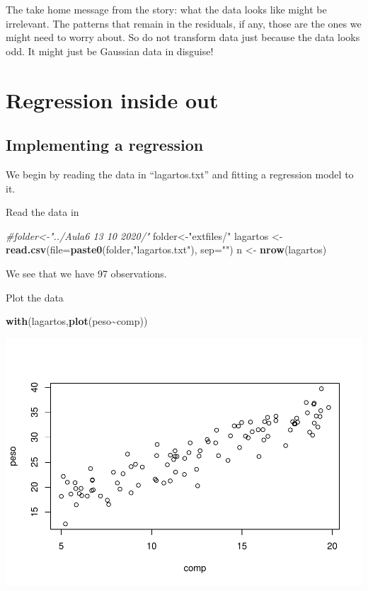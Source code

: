 \documentclass[
]{book}
\newenvironment{Shaded}{\begin{snugshade}}{\end{snugshade}}
\newcommand{\AttributeTok}[1]{\textcolor[rgb]{0.13,0.29,0.53}{#1}}
\newcommand{\CommentTok}[1]{\textcolor[rgb]{0.56,0.35,0.01}{\textit{#1}}}
\newcommand{\FunctionTok}[1]{\textcolor[rgb]{0.13,0.29,0.53}{\textbf{#1}}}
\newcommand{\NormalTok}[1]{#1}
\newcommand{\OtherTok}[1]{\textcolor[rgb]{0.56,0.35,0.01}{#1}}
\newcommand{\SpecialCharTok}[1]{\textcolor[rgb]{0.81,0.36,0.00}{\textbf{#1}}}
\newcommand{\StringTok}[1]{\textcolor[rgb]{0.31,0.60,0.02}{#1}}
\begin{document}
The take home message from the story: what the data looks like might be irrelevant. The patterns that remain in the residuals, if any, those are the ones we might need to worry about. So do not transform data just because the data looks odd. It might just be Gaussian data in disguise!

\hypertarget{aula6}{%
\chapter{Regression inside out}\label{aula6}}

\hypertarget{implementing-a-regression}{%
\section{Implementing a regression}\label{implementing-a-regression}}

We begin by reading the data in ``lagartos.txt'' and fitting a regression model to it.

Read the data in

\begin{Shaded}
\begin{Highlighting}[]
\CommentTok{\#folder\textless{}{-}"../Aula6 13 10 2020/"}
\NormalTok{folder}\OtherTok{\textless{}{-}}\StringTok{"extfiles/"}
\NormalTok{lagartos }\OtherTok{\textless{}{-}} \FunctionTok{read.csv}\NormalTok{(}\AttributeTok{file=}\FunctionTok{paste0}\NormalTok{(folder,}\StringTok{"lagartos.txt"}\NormalTok{), }\AttributeTok{sep=}\StringTok{""}\NormalTok{)}
\NormalTok{n }\OtherTok{\textless{}{-}} \FunctionTok{nrow}\NormalTok{(lagartos)}
\end{Highlighting}
\end{Shaded}

We see that we have 97 observations.

Plot the data

\begin{Shaded}
\begin{Highlighting}[]
\FunctionTok{with}\NormalTok{(lagartos,}\FunctionTok{plot}\NormalTok{(peso}\SpecialCharTok{\textasciitilde{}}\NormalTok{comp))}
\end{Highlighting}
\end{Shaded}

\includegraphics{ECOMODbook_files/figure-latex/a6.2-1.pdf}
\end{document}
